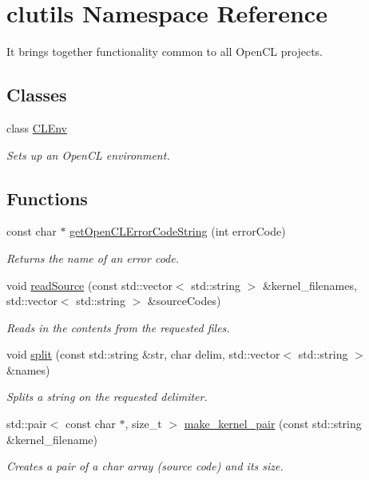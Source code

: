 \hypertarget{namespaceclutils}{}\section{clutils Namespace Reference}
\label{namespaceclutils}


It brings together functionality common to all Open\+C\+L projects.  


\subsection*{Classes}
\begin{DoxyCompactItemize}
\item 
class \hyperlink{classclutils_1_1CLEnv}{C\+L\+Env}
\begin{DoxyCompactList}\small\item\em Sets up an Open\+C\+L environment. \end{DoxyCompactList}\end{DoxyCompactItemize}
\subsection*{Functions}
\begin{DoxyCompactItemize}
\item 
const char $\ast$ \hyperlink{namespaceclutils_a8741b6850668dbbdb8a283122365c1d9}{get\+Open\+C\+L\+Error\+Code\+String} (int error\+Code)
\begin{DoxyCompactList}\small\item\em Returns the name of an error code. \end{DoxyCompactList}\item 
void \hyperlink{namespaceclutils_aade8becb266bc2e98a7b37f05001011e}{read\+Source} (const std\+::vector$<$ std\+::string $>$ \&kernel\+\_\+filenames, std\+::vector$<$ std\+::string $>$ \&source\+Codes)
\begin{DoxyCompactList}\small\item\em Reads in the contents from the requested files. \end{DoxyCompactList}\item 
void \hyperlink{namespaceclutils_a585a32b5c93ecbbf1f233b362f76e988}{split} (const std\+::string \&str, char delim, std\+::vector$<$ std\+::string $>$ \&names)
\begin{DoxyCompactList}\small\item\em Splits a string on the requested delimiter. \end{DoxyCompactList}\item 
std\+::pair$<$ const char $\ast$, size\+\_\+t $>$ \hyperlink{namespaceclutils_a485db8206a6181bbba6e1a110c0b9bb2}{make\+\_\+kernel\+\_\+pair} (const std\+::string \&kernel\+\_\+filename)
\begin{DoxyCompactList}\small\item\em Creates a pair of a char array (source code) and its size. \end{DoxyCompactList}\end{DoxyCompactItemize}



